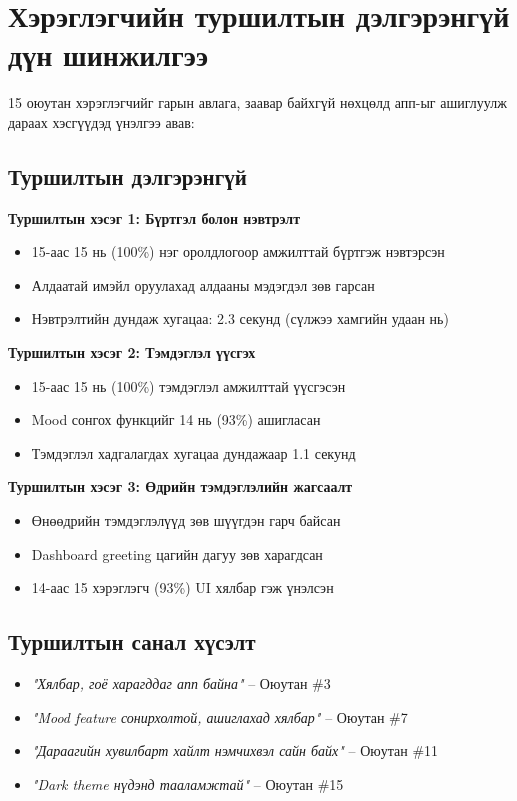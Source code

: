\section{Хэрэглэгчийн туршилтын дэлгэрэнгүй дүн шинжилгээ}

15 оюутан хэрэглэгчийг гарын авлага, заавар байхгүй нөхцөлд апп-ыг ашиглуулж
дараах хэсгүүдэд үнэлгээ авав:

\subsection{Туршилтын дэлгэрэнгүй}

\textbf{Туршилтын хэсэг 1: Бүртгэл болон нэвтрэлт}
\begin{itemize}
  \item 15-аас 15 нь (100\%) нэг оролдлогоор амжилттай бүртгэж нэвтэрсэн
  \item Алдаатай имэйл оруулахад алдааны мэдэгдэл зөв гарсан
  \item Нэвтрэлтийн дундаж хугацаа: 2.3 секунд (сүлжээ хамгийн удаан нь)
\end{itemize}

\textbf{Туршилтын хэсэг 2: Тэмдэглэл үүсгэх}
\begin{itemize}
  \item 15-аас 15 нь (100\%) тэмдэглэл амжилттай үүсгэсэн
  \item Mood сонгох функцийг 14 нь (93\%) ашигласан
  \item Тэмдэглэл хадгалагдах хугацаа дундажаар 1.1 секунд
\end{itemize}

\textbf{Туршилтын хэсэг 3: Өдрийн тэмдэглэлийн жагсаалт}
\begin{itemize}
  \item Өнөөдрийн тэмдэглэлүүд зөв шүүгдэн гарч байсан
  \item Dashboard greeting цагийн дагуу зөв харагдсан
  \item 14-аас 15 хэрэглэгч (93\%) UI хялбар гэж үнэлсэн
\end{itemize}

\subsection{Туршилтын санал хүсэлт}

\begin{itemize}
  \item \textit{"Хялбар, гоё харагддаг апп байна"} -- Оюутан \#3
  \item \textit{"Mood feature сонирхолтой, ашиглахад хялбар"} -- Оюутан \#7
  \item \textit{"Дараагийн хувилбарт хайлт нэмчихвэл сайн байх"} -- Оюутан \#11
  \item \textit{"Dark theme нүдэнд тааламжтай"} -- Оюутан \#15
\end{itemize}
